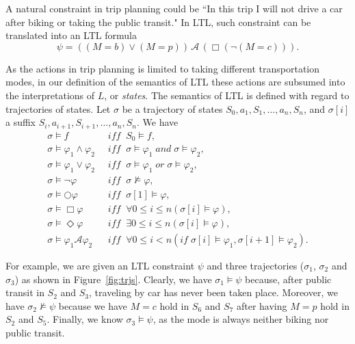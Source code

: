 \documentclass[letterpaper]{article}
\newcommand{\cA}{\mathcal{A}}
\newcommand{\tit}[1]{\textit{#1}}
\newcommand{\IFF}{\textit{iff}}
\newcommand{\IF}{\textit{if}}
\newcommand{\figref}[1]{Figure~\ref{fig:#1}}
\begin{document}
A natural constraint in trip planning could be ``In this trip I will not drive a car 
after biking or taking the public transit."
In LTL, such constraint can be translated into an LTL formula
\begin{equation}
\label{eqt:ex}
	\psi = ((M=b) \lor (M=p)) \,\cA\, (\Box (\neg (M=c))).
\end{equation}

As the actions in trip planning is limited to taking different transportation modes,
in our definition of the semantics of LTL
these actions are subsumed into the interpretations of $L$, or \tit{states}.
The semantics of LTL is defined with regard to trajectories of states. 
Let $\sigma$ be a trajectory of states $S_0,a_1,S_1,\ldots,a_n,S_n$, and
$\sigma[i]$ a suffix $S_i, a_{i+1}, S_{i+1}, \ldots,a_n,S_n$.  We have
\begin{align*}
	\sigma \models f \;\; &\IFF \;\; S_0 \models f,\\
	\sigma \models \varphi_1 \land \varphi_2 \;\; &\IFF \;\; \sigma \models \varphi_1 \; and \; \sigma \models \varphi_2,\\
	\sigma \models \varphi_1 \lor \varphi_2 \;\; &\IFF \;\; \sigma \models \varphi_1 \; or \; \sigma \models \varphi_2,\\
	\sigma \models \neg \varphi \;\; &\IFF \;\; \sigma \not \models \varphi,\\
	\sigma \models \bigcirc \varphi \;\; &\IFF \;\; \sigma[1] \models \varphi,\\
	\sigma \models \Box \varphi \;\; &\IFF \;\; \forall 0 \leq i \leq n (\sigma[i] \models \varphi),\\
	\sigma \models \Diamond \varphi \;\; &\IFF \;\; \exists 0 \leq i \leq n (\sigma[i] \models \varphi),\\
	\sigma \models \varphi_1 \cA \varphi_2 \;\; &\IFF \;\; \forall 0 \leq i < n (\IF \; \sigma[i] \models \varphi_1, \sigma[i+1] \models \varphi_2).
\end{align*}

For example, we are given an LTL constraint $\psi$ and three trajectories ($\sigma_1$, $\sigma_2$ and $\sigma_3$)
as shown in \figref{trjs}.
Clearly, we have $\sigma_1 \models \psi$ because, after public transit in $S_2$ and $S_3$, 
traveling by car has never been taken place.
Moreover, we have $\sigma_2 \not \models \psi$ because we have $M=c$ hold in $S_6$ and $S_7$
after having $M=p$ hold in $S_2$ and $S_5$.
Finally, we know $\sigma_3 \models \psi$, as the mode is always neither biking nor public transit.
\end{document}
